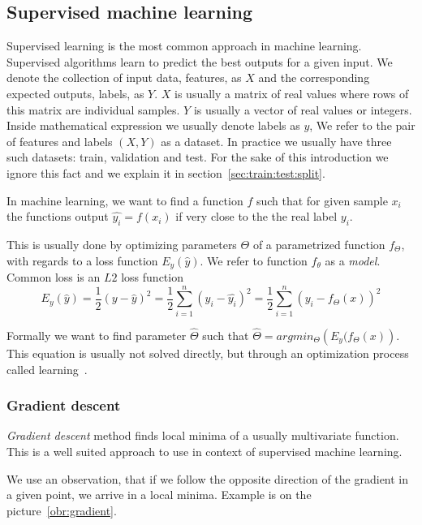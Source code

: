     \subsection{Supervised machine learning}
    
    Supervised learning is the most common approach in machine learning. 
    Supervised algorithms learn to predict the best outputs for a given input.
    We denote the collection of input data, features, as $X$ and the corresponding expected outputs, labels, as $Y$.
    $X$ is usually a matrix of real values where rows of this matrix are individual samples.
    $Y$ is usually a vector of real values or integers. 
    Inside mathematical expression we usually denote labels as $y$,
    We refer to the pair of features and labels $(X, Y)$ as a dataset.
    In practice we usually have three such datasets: train, validation and test. 
    For the sake of this introduction we ignore this fact and we explain it in section~\ref{sec:train:test:split}.
    
    In machine learning, we want to find a function $f$ such that for given sample $x_i$
    the functions output $\hat{y_i} = f(x_i)$ if very close to the the real label $y_i$.
    
    This is usually done by optimizing parameters $\Theta$ of a parametrized function $f_\Theta$,
    with regards to a loss function $E_y(\hat{y})$. 
    We refer to function $f_\theta$ as a \textit{model}.
    Common loss is an $L2$ loss function 
    $$E_y(\hat{y}) = \frac{1}{2}(y - \hat{y})^2 = \frac{1}{2}\sum_{i=1}^n (y_i - \hat{y_i})^2= \frac{1}{2}\sum_{i=1}^n (y_i - f_\Theta(x))^2$$  
    
    Formally we want to find parameter $\hat{\Theta}$ such that $\hat{\Theta} = argmin_\Theta \left(E_y(f_\Theta(x) \right)$. 
    This equation is usually not solved directly, but through an optimization process called learning~\cite{Goodfellow-et-al-2016}. %
    
    \subsubsection{Gradient descent}

    \textit{Gradient descent} method finds local minima of a usually multivariate function. 
    This is a well suited approach to use in context of supervised machine learning. 
    
    We use an observation, that if we follow the opposite direction of the gradient in a given point, 
    we arrive in a local minima. Example is on the picture~\ref{obr:gradient}.
    

